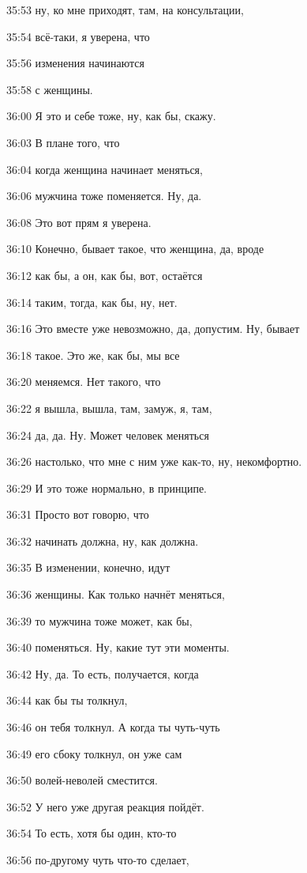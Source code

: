 35:53
ну, ко мне приходят, там, на консультации,

35:54
всё-таки, я уверена, что

35:56
изменения начинаются

35:58
с женщины.

36:00
Я это и себе тоже, ну, как бы, скажу.

36:03
В плане того, что

36:04
когда женщина начинает меняться,

36:06
мужчина тоже поменяется. Ну, да.

36:08
Это вот прям я уверена.

36:10
Конечно, бывает такое, что женщина, да, вроде

36:12
как бы, а он, как бы, вот, остаётся

36:14
таким, тогда, как бы, ну, нет.

36:16
Это вместе уже невозможно, да, допустим. Ну, бывает

36:18
такое. Это же, как бы, мы все

36:20
меняемся. Нет такого, что

36:22
я вышла, вышла, там, замуж, я, там,

36:24
да, да. Ну. Может человек меняться

36:26
настолько, что мне с ним уже как-то, ну, некомфортно.

36:29
И это тоже нормально, в принципе.

36:31
Просто вот говорю, что

36:32
начинать должна, ну, как должна.

36:35
В изменении, конечно, идут

36:36
женщины. Как только начнёт меняться,

36:39
то мужчина тоже может, как бы,

36:40
поменяться. Ну, какие тут эти моменты.

36:42
Ну, да. То есть, получается, когда

36:44
как бы ты толкнул,

36:46
он тебя толкнул. А когда ты чуть-чуть

36:49
его сбоку толкнул, он уже сам

36:50
волей-неволей сместится.

36:52
У него уже другая реакция пойдёт.

36:54
То есть, хотя бы один, кто-то

36:56
по-другому чуть что-то сделает,

